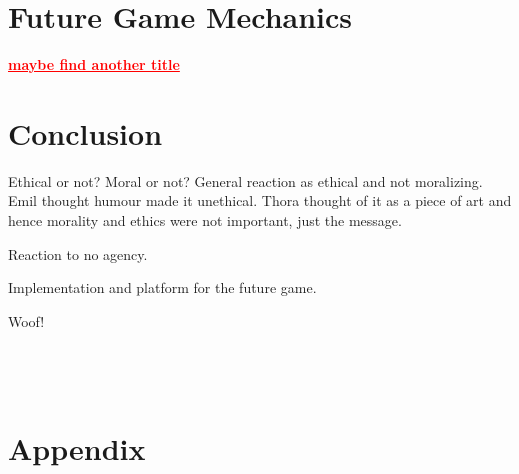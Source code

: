\documentclass[preprint,12pt, authoryear]{elsarticle}
\newcommand\commenting[1]{\textcolor{red}{\textbf{\underline{#1}}}}
\begin{document}
\section{Future Game Mechanics}
\commenting{maybe find another title}
\label{Future}




\section{Conclusion}
Ethical or not?
Moral or not? General reaction as ethical and not moralizing. Emil thought humour made it unethical. Thora thought of it as a piece of art and hence morality and ethics were not important, just the message.\

Reaction to no agency. \

Implementation and platform for the future game.\

Woof!\





\section*{\refname}



\








\appendix

\section{Appendix}
\label{appendix}
\end{document}
